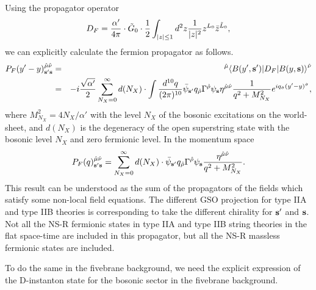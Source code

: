 \documentclass[a4paper,prd,preprint]{revtex4}
\begin{document}
Using the propagator operator
\begin{equation}
 D_F = {{\alpha'} \over {4\pi}} \cdot {\tilde G}_0 \cdot {1 \over 2}
       \int_{|z| \le 1} d^2z {1 \over {|z|^2}}
       z^{L_0} {\bar z}^{{\tilde L}_0},
\label{prop_op_F}
\end{equation}
 we can explicitly calculate the fermion propagator as follows.
\begin{eqnarray}
 P_F(y'-y)_{{\bf s}'{\bf s}}^{{\hat \mu} {\hat \nu}}
 &=& {}^{{\hat \mu}}\langle B(y',{\bf s}') |
     D_F
     | B(y,{\bf s}) \rangle^{\hat \nu}
\nonumber\\
 &=& -i {\sqrt{\alpha'} \over 2}
     \sum_{N_X=0}^\infty d(N_X) \cdot
     \int {{d^{10} q} \over {(2\pi)^{10}}}
     {\bar \psi}_{{\bf s}'}
      q_{\hat \rho} \Gamma^{\hat \rho} \psi_{\bf s}
     \eta^{{\hat \mu} {\hat \nu}} {1 \over {q^2 + M_{N_X}^2}}
     e^{i q_{\hat \sigma} (y'-y)^{\hat \sigma}},
\label{propagator0}
\end{eqnarray}
 where $M_{N_X}^2 = 4 N_X / \alpha'$
 with the level $N_X$ of the bosonic excitations on the world-sheet,
 and $d(N_X)$ is the degeneracy of the open superstring state
 with the bosonic level $N_X$ and zero fermionic level.
In the momentum space
\begin{equation}
 P_F(q)_{{\bf s}'{\bf s}}^{{\hat \mu} {\hat \nu}}
 =  \sum_{N_X=0}^\infty d(N_X) \cdot
     {\bar \psi}_{{\bf s}'}
      q_{\hat \rho} \Gamma^{\hat \rho} \psi_{\bf s}
     {{\eta^{{\hat \mu} {\hat \nu}}} \over {q^2 + M_{N_X}^2}}.
\label{propagator0-p}
\end{equation}
This result can be understood
 as the sum of the propagators of the fields
 which satisfy some non-local field equations.
The different GSO projection for type IIA and type IIB theories
 is corresponding to take the different chirality
 for ${\bf s}'$ and ${\bf s}$.
Not all the NS-R fermionic states
 in type IIA and type IIB string theories in the flat space-time
 are included in this propagator,
 but all the NS-R massless fermionic states are included.

To do the same in the fivebrane background,
 we need the explicit expression of the D-instanton state
 for the bosonic sector
 in the fivebrane background.
\end{document}
